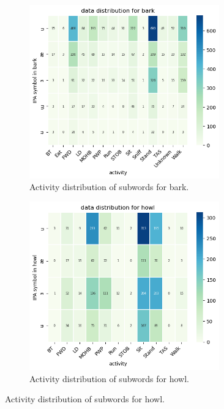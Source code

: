 \documentclass[letterpaper]{article}
\begin{document}
\begin{figure}[h]
\centering
\begin{subfigure}[]{0.4\textwidth}
	\centering
	\includegraphics[width=0.9\textwidth]{images/symbol_bark.png}
	\caption{Activity distribution of subwords for bark.}
	\label{fig:11}
\end{subfigure}
\begin{subfigure}[]{0.4\textwidth}
	\centering
	\includegraphics[width=0.9\textwidth]{images/symbol_howl.png}
	\caption{Activity distribution of subwords for howl.}
	\label{fig:21}
\end{subfigure}


\end{figure}
\end{document}
